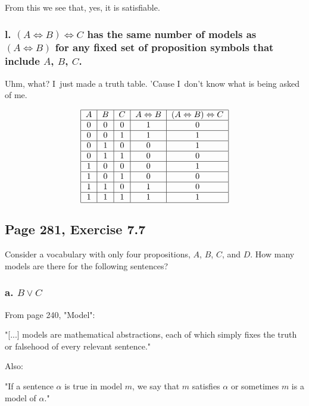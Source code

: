 \documentclass{article}
\begin{document}
From this we see that, yes, it is satisfiable.

\subsubsection{l. $\left( A\Leftrightarrow B\right) \Leftrightarrow C$ has
the same number of models as $\left( A\Leftrightarrow B\right) $ for any
fixed set of proposition symbols that include $A$, $B$, $C$.}

Uhm, what? I\ just made a truth table. 'Cause I\ don't know what is being
asked of me.

\[
\begin{tabular}{|c|c|c|c|c|}
\hline
$A$ & $B$ & $C$ & $A\Leftrightarrow B$ & $\left( A\Leftrightarrow B\right)
\Leftrightarrow C$ \\ \hline
0 & 0 & 0 & 1 & 0 \\ \hline
0 & 0 & 1 & 1 & 1 \\ \hline
0 & 1 & 0 & 0 & 1 \\ \hline
0 & 1 & 1 & 0 & 0 \\ \hline
1 & 0 & 0 & 0 & 1 \\ \hline
1 & 0 & 1 & 0 & 0 \\ \hline
1 & 1 & 0 & 1 & 0 \\ \hline
1 & 1 & 1 & 1 & 1 \\ \hline
\end{tabular}%
\]

\bigskip 

\subsection{Page 281, Exercise 7.7}

Consider a vocabulary with only four propositions, $A$, $B$, $C$, and $D$.
How many models are there for the following sentences?

\subsubsection{a. $B\vee C$}

From page 240, "Model":

"[...] models are mathematical abstractions, each of which simply fixes the
truth or falsehood of every relevant sentence."

Also:

"If a sentence $\alpha $ is true in model $m$, we say that $m$ satisfies $%
\alpha $ or sometimes $m$ is a model of $\alpha $."
\end{document}
